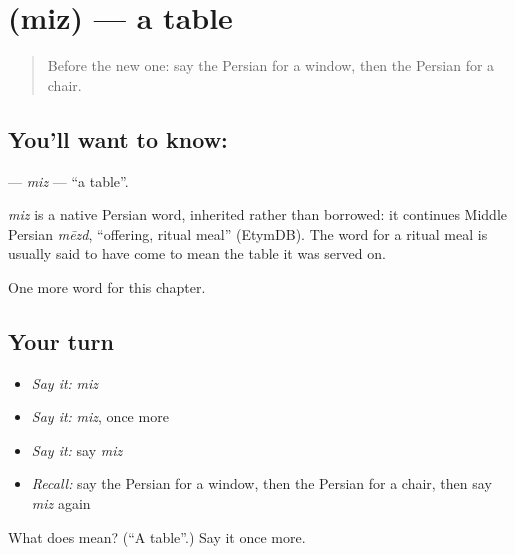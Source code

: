 \section[\texorpdfstring{\fa{میز} (miz)}{میز (miz)}]{ (miz) — a table}

\label{lesson:FA-C45-miz}



\begin{quote}
Before the new one: say the Persian for a window, then the Persian for a chair.
\end{quote}

\subsection*{You'll want to know: }
\textbf{} — \emph{miz} — \textquotedblleft{}a table\textquotedblright{}.

\begin{cousinweb}
\emph{miz} is a native Persian word, inherited rather than borrowed: it continues Middle Persian \emph{mēzd}, \textquotedblleft{}offering, ritual meal\textquotedblright{} (EtymDB). The word for a ritual meal is usually said to have come to mean the table it was served on.
\end{cousinweb}

\begin{grammarlens}[title={What you've built}]
One more word for this chapter.
\end{grammarlens}

\subsection*{Your turn}
\begin{itemize}
\raggedright
  \item \emph{Say it:} \emph{miz}
  \item \emph{Say it:} \emph{miz}, once more
  \item \emph{Say it:} say \emph{miz}
  \item \emph{Recall:} say the Persian for a window, then the Persian for a chair, then say \emph{miz} again
\end{itemize}

\begin{tcolorbox}[breakable,colback=teal!4,colframe=teal!35!black,title={Before you move on}]
What does  mean? (\textquotedblleft{}A table\textquotedblright{}.) Say it once more.
\end{tcolorbox}
